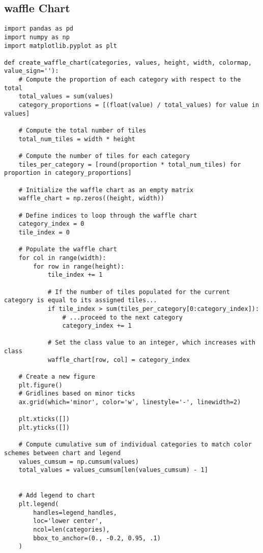 \documentclass{article}
\begin{document}
\subsection{waffle Chart}
\begin{lstlisting}[caption={Python code for Waffle Chart}]
import pandas as pd
import numpy as np
import matplotlib.pyplot as plt

def create_waffle_chart(categories, values, height, width, colormap, value_sign=''):
    # Compute the proportion of each category with respect to the total
    total_values = sum(values)
    category_proportions = [(float(value) / total_values) for value in values]

    # Compute the total number of tiles
    total_num_tiles = width * height

    # Compute the number of tiles for each category
    tiles_per_category = [round(proportion * total_num_tiles) for proportion in category_proportions]

    # Initialize the waffle chart as an empty matrix
    waffle_chart = np.zeros((height, width))

    # Define indices to loop through the waffle chart
    category_index = 0
    tile_index = 0

    # Populate the waffle chart
    for col in range(width):
        for row in range(height):
            tile_index += 1

            # If the number of tiles populated for the current category is equal to its assigned tiles...
            if tile_index > sum(tiles_per_category[0:category_index]):
                # ...proceed to the next category
                category_index += 1       

            # Set the class value to an integer, which increases with class
            waffle_chart[row, col] = category_index

    # Create a new figure
    plt.figure()
    # Gridlines based on minor ticks
    ax.grid(which='minor', color='w', linestyle='-', linewidth=2)

    plt.xticks([])
    plt.yticks([])

    # Compute cumulative sum of individual categories to match color schemes between chart and legend
    values_cumsum = np.cumsum(values)
    total_values = values_cumsum[len(values_cumsum) - 1]


    # Add legend to chart
    plt.legend(
        handles=legend_handles,
        loc='lower center', 
        ncol=len(categories),
        bbox_to_anchor=(0., -0.2, 0.95, .1)
    )


\end{lstlisting}
\end{document}

